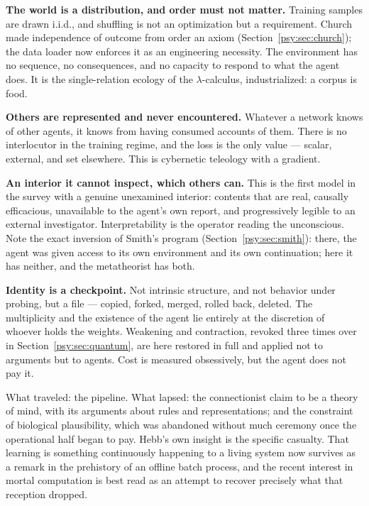 \textbf{The world is a distribution, and order must not matter.}
Training samples are drawn i.i.d., and shuffling is not an
optimization but a requirement.
Church made independence of outcome from order an axiom
(Section~\ref{psy:sec:church}); the data loader now enforces it as
an engineering necessity.
The environment has no sequence, no consequences, and no capacity to
respond to what the agent does.
It is the single-relation ecology of the $\lambda$-calculus,
industrialized: a corpus is food.

\textbf{Others are represented and never encountered.}
Whatever a network knows of other agents, it knows from having
consumed accounts of them.
There is no interlocutor in the training regime, and the loss is the
only value --- scalar, external, and set elsewhere.
This is cybernetic teleology with a gradient.

\textbf{An interior it cannot inspect, which others can.}
This is the first model in the survey with a genuine unexamined
interior: contents that are real, causally efficacious, unavailable
to the agent's own report, and progressively legible to an external
investigator.
Interpretability is the operator reading the unconscious.
Note the exact inversion of Smith's program
(Section~\ref{psy:sec:smith}): there, the agent was given access to
its own environment and its own continuation; here it has neither,
and the metatheorist has both.

\textbf{Identity is a checkpoint.}
Not intrinsic structure, and not behavior under probing, but a file
--- copied, forked, merged, rolled back, deleted.
The multiplicity and the existence of the agent lie entirely at the
discretion of whoever holds the weights.
Weakening and contraction, revoked three times over in
Section~\ref{psy:sec:quantum}, are here restored in full and applied
not to arguments but to agents.
Cost is measured obsessively, but the agent does not pay it.

What traveled: the pipeline.
What lapsed: the connectionist claim to be a theory of mind, with
its arguments about rules and representations; and the constraint of
biological plausibility, which was abandoned without much ceremony
once the operational half began to pay.
Hebb's own insight is the specific casualty.
That learning is something continuously happening to a living system
now survives as a remark in the prehistory of an offline batch
process, and the recent interest in mortal computation
\cite{Hinton} is best read as an attempt to recover precisely
what that reception dropped.

